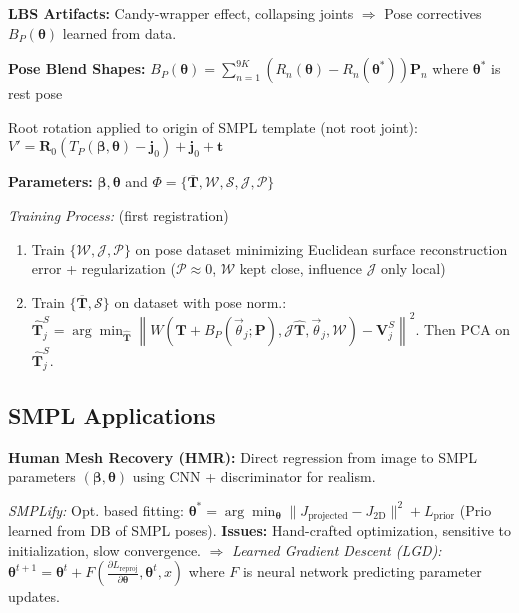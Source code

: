 \textbf{LBS Artifacts:} Candy-wrapper effect, collapsing joints $\Rightarrow$ Pose correctives $B_P(\boldsymbol{\theta})$ learned from data.

\textbf{Pose Blend Shapes:} $B_P(\boldsymbol{\theta}) = \sum_{n=1}^{9K}(R_n(\boldsymbol{\theta}) - R_n(\boldsymbol{\theta}^*)) \mathbf{P}_n$ where $\boldsymbol{\theta}^*$ is rest pose

Root rotation applied to origin of SMPL template (not root joint): $V' = \mathbf{R}_0(T_P(\boldsymbol{\beta}, \boldsymbol{\theta})- \mathbf{j}_0)+ \mathbf{j}_0 + \mathbf{t}$


\textbf{Parameters:} $\boldsymbol{\beta}, \boldsymbol{\theta}$ and $\Phi = \{\overline{\mathbf{T}}, \mathcal{W}, \mathcal{S}, \mathcal{J}, \mathcal{P}\}$

\emph{Training Process:} (first registration)
\begin{enumerate}
\item Train $\{\mathcal{W}, \mathcal{J}, \mathcal{P}\}$ on pose dataset minimizing Euclidean
surface reconstruction error + regularization ({\footnotesize $\mathcal{P} \approx 0$, $\mathcal{W}$ kept close, influence $\mathcal{J}$ only local})
\item Train $\{\overline{\mathbf{T}}, \mathcal{S}\}$ on dataset with pose norm.: {\footnotesize$\hat{\mathbf{T}}^{S}_{j} = \arg\min_{\hat{\mathbf{T}}} \left\| W\left( \mathbf{T} + B_P(\vec{\theta}_j; \mathbf{P}), \mathcal{J}\hat{\mathbf{T}}, \vec{\theta}_j, \mathcal{W} \right) - \mathbf{V}^{S}_{j} \right\|^2$}. Then PCA on $\hat{\mathbf{T}}^{S}_{j}$.
\end{enumerate}


\subsection{SMPL Applications}

\textbf{Human Mesh Recovery (HMR):} Direct regression from image to SMPL parameters $(\boldsymbol{\beta}, \boldsymbol{\theta})$ using CNN + discriminator for realism.

\emph{SMPLify:} Opt. based fitting:
{\footnotesize$\boldsymbol{\theta}^* = \arg\min_{\boldsymbol{\theta}} \|J_{\text{projected}} - J_{\text{2D}}\|^2 + L_{\text{prior}}$} (Prio learned from DB of SMPL poses).
\textbf{Issues:} Hand-crafted optimization, sensitive to initialization, slow convergence. $\Rightarrow$ \textit{Learned Gradient Descent (\emph{LGD}):}
{\footnotesize$\boldsymbol{\theta}^{t+1} = \boldsymbol{\theta}^t + F(\frac{\partial L_{\text{reproj}}}{\partial \boldsymbol{\theta}}, \boldsymbol{\theta}^t, x)$}
where $F$ is neural network predicting parameter updates.

